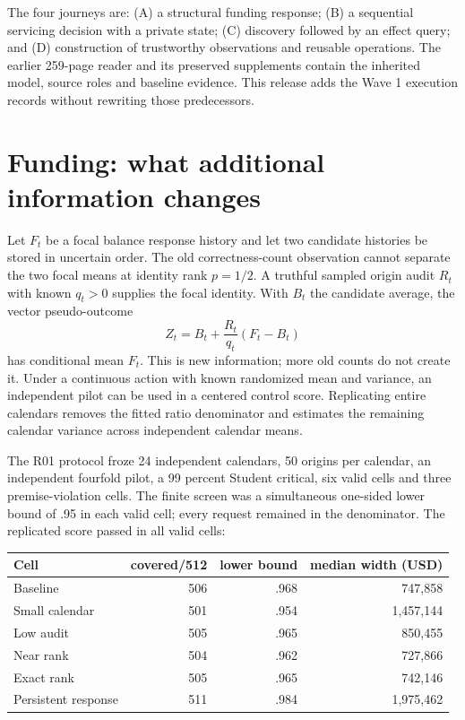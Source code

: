 \documentclass[11pt,a4paper]{article}
\begin{document}
The four journeys are: (A) a structural funding response; (B) a sequential
servicing decision with a private state; (C) discovery followed by an effect
query; and (D) construction of trustworthy observations and reusable
operations. The earlier 259-page reader and its preserved supplements contain
the inherited model, source roles and baseline evidence. This release adds
the Wave 1 execution records without rewriting those predecessors.

\section{Funding: what additional information changes}

Let $F_t$ be a focal balance response history and let two candidate histories
be stored in uncertain order. The old correctness-count observation cannot
separate the two focal means at identity rank $p=1/2$. A truthful sampled
origin audit $R_t$ with known $q_t>0$ supplies the focal identity. With
$B_t$ the candidate average, the vector pseudo-outcome
\[
 Z_t=B_t+\frac{R_t}{q_t}(F_t-B_t)
\]
has conditional mean $F_t$. This is new information; more old counts do not
create it. Under a continuous action with known randomized mean and variance,
an independent pilot can be used in a centered control score. Replicating
entire calendars removes the fitted ratio denominator and estimates the
remaining calendar variance across independent calendar means.

The R01 protocol froze 24 independent calendars, 50 origins per calendar,
an independent fourfold pilot, a 99 percent Student critical, six valid cells
and three premise-violation cells. The finite screen was a simultaneous
one-sided lower bound of .95 in each valid cell; every request remained in
the denominator. The replicated score passed in all valid cells:

\begin{center}
\begin{tabular}{lrrr}
\toprule
Cell & covered/512 & lower bound & median width (USD)\\
\midrule
Baseline & 506 & .968 & 747,858\\
Small calendar & 501 & .954 & 1,457,144\\
Low audit & 505 & .965 & 850,455\\
Near rank & 504 & .962 & 727,866\\
Exact rank & 505 & .965 & 742,146\\
Persistent response & 511 & .984 & 1,975,462\\
\bottomrule
\end{tabular}
\end{center}
\end{document}
